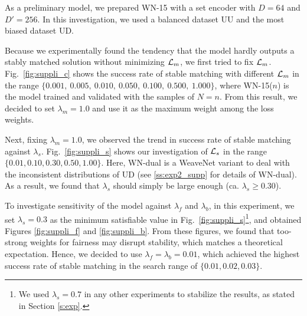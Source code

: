 As a preliminary model, we prepared WN-15 with a set encoder with $D=64$ and $D'=256$. In this investigation, we used a balanced dataset UU and the most biased dataset UD.

Because we experimentally found the tendency that the model hardly outputs a stably matched solution without minimizing ${\mathcal L}_m$, we first tried to fix ${\mathcal L}_m$.
Fig.~\ref{fig:suppli_c} shows the success rate of stable matching with different ${\mathcal L}_m$ in the range $\{0.001,~0.005,~0.010,~0.050,~0.100,~0.500,~1.000\}$, where WN-15($n$) is the model trained and validated with the samples of $N=n$. 
From this result, we decided to set $\lambda_m=1.0$ and use it as the maximum weight among the loss weights.

Next, fixing $\lambda_m=1.0$, we observed the trend in success rate of stable matching against $\lambda_s$. Fig.~\ref{fig:suppli_s} shows our investigation of ${\mathcal L}_s$ in the range $\{0.01,0.10,0.30,0.50,1.00\}$. 
Here, WN-dual is a WeaveNet variant to deal with the inconsistent distributions of UD (see \ref{ss:exp2_supp} for details of WN-dual).
As a result, we found that $\lambda_s$ should simply be large enough (ca. $\lambda_s\geq 0.30$).

To investigate sensitivity of the model against $\lambda_f$ and $\lambda_b$, in this experiment, we set $\lambda_s=0.3$ as the minimum satisfiable value in Fig.~\ref{fig:suppli_s}\footnote{We used $\lambda_s=0.7$ in any other experiments to stabilize the results, as stated in Section \ref{s:exp}.}, and obtained Figures \ref{fig:suppli_f} and \ref{fig:suppli_b}. From these figures, we found that too-strong weights for fairness may disrupt stability, which matches a theoretical expectation. Hence, we decided to use $\lambda_f=\lambda_b=0.01$, which achieved the highest success rate of stable matching in the search range of $\{0.01,0.02,0.03\}$.

